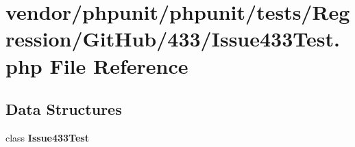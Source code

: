 \section{vendor/phpunit/phpunit/tests/\+Regression/\+Git\+Hub/433/\+Issue433\+Test.php File Reference}
\label{_issue433_test_8php}
\subsection*{Data Structures}
\begin{DoxyCompactItemize}
\item 
class {\bf Issue433\+Test}
\end{DoxyCompactItemize}
